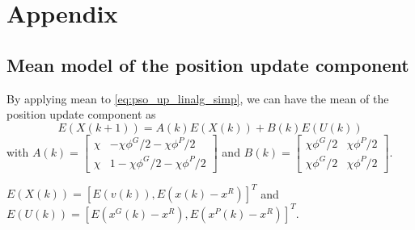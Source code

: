 \section{Appendix}

\subsection{Mean model of the position update component}
\label{app:mean_pso}

By applying mean to \eqref{eq:pso_up_linalg_simp}, we can have the mean of the position update component as
\begin{equation}
\label{eq:pso_up_linalg_simp:mean}
E( X(k+1) ) = A(k) E( X(k) ) + B(k) E( U(k) )
\end{equation}
with
$ A(k) = \begin{bmatrix}
\chi & - \chi \phi^{G}/2 - \chi \phi^{P}/2
\\ 
\chi & 1 - \chi \phi^{G}/2 - \chi \phi^{P}/2
\end{bmatrix} $
and
$ B(k) = \begin{bmatrix}
\chi \phi^{G}/2 & \chi \phi^{P}/2
\\ 
\chi \phi^{G}/2 & \chi \phi^{P}/2
\end{bmatrix} $.

$ E( X(k) ) = [ E( v(k) ), E( x(k) - x^{R} ) ]^{T} $ and $ E( U(k) ) = [ E( x^{G}(k) - x^{R} ) , E( x^{P}(k) - x^{R} ) ]^{T} $.